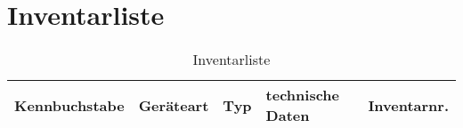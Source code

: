 \section{Inventarliste}

\begin{table}[h]

	\caption{Inventarliste}
	\begin{tabular}{|L{2.6cm}|L{2cm}|L{2.5cm}|L{4.4cm}|L{3cm}|} 
		\hline
		Kennbuchstabe & Geräteart & Typ & technische Daten & Inventarnr. \\  \hline

 	

 		
	\end{tabular}
\end{table}

\newpage
